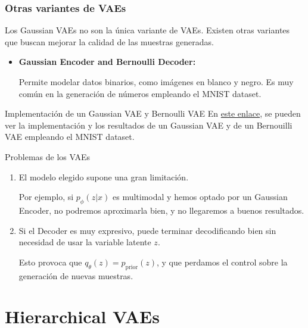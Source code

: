 \documentclass{beamer}
\begin{document}
\begin{frame}
    \frametitle{Otras variantes de VAEs}

    Los Gaussian VAEs no son la única variante de VAEs. Existen otras variantes que buscan mejorar la calidad de las muestras generadas.
    \begin{itemize}
        \item \textbf{Gaussian Encoder and Bernoulli Decoder:} 
        
        Permite modelar datos binarios, como imágenes en blanco y negro. Es muy común en la generación de números empleando el MNIST dataset.
    \end{itemize}\pause

    \begin{exampleblock}{Implementación de un Gaussian VAE y Bernoulli VAE}
        En \href{https://github.com/arturo-olvrs/VAE-MINST}{este enlace}, se pueden ver la implementación y los resultados de un Gaussian VAE y de un Bernouilli VAE empleando el MNIST dataset.
    \end{exampleblock}
\end{frame}

\begin{frame}{Problemas de los VAEs}

    \begin{enumerate}
        \item El modelo elegido supone una gran limitación.
        
        Por ejemplo, si $p_{\phi}(z|x)$ es multimodal y hemos optado por un Gaussian Encoder, no podremos aproximarla bien, y no llegaremos a buenos resultados.
        \pause
        \item Si el Decoder es muy expresivo, puede terminar decodificando bien sin necesidad de usar la variable latente $z$.
        
        Esto provoca que $q_{\theta}(z)=p_{\text{prior}}(z)$, y que perdamos el control sobre la generación de nuevas muestras.
    \end{enumerate}
    
\end{frame}


\section{Hierarchical VAEs}
\end{document}
